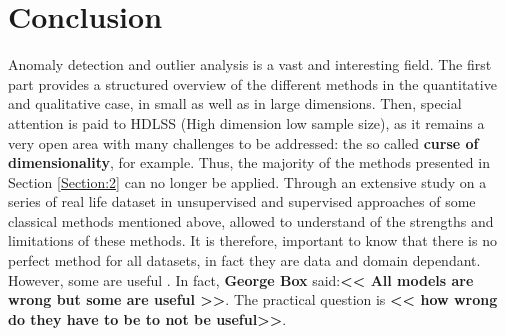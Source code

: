 \section{Conclusion}
 Anomaly detection and outlier analysis is a vast and interesting field. The first part provides a structured overview of the different methods in the quantitative and qualitative case, in small as well as in large dimensions. Then, special attention is paid to HDLSS (High dimension low sample size), as it remains a very open area with many challenges to be addressed: the so called \textbf{curse of dimensionality}, for example. Thus, the majority of the methods presented in Section \ref{Section:2} can no longer be applied.  Through an extensive study on a series of real life dataset in unsupervised and supervised approaches of some classical methods mentioned above, allowed to understand of  the strengths and limitations of these methods. It is therefore, important to know that there is no perfect method for all datasets, in fact they are data and domain dependant. However, some are useful . In fact, \textbf{George Box} said:\textbf{<< All models are wrong but some are useful >>}. The practical question is \textbf{<< how wrong do they have to be to not be useful>>}.

\afterpage{\FloatBarrier}
